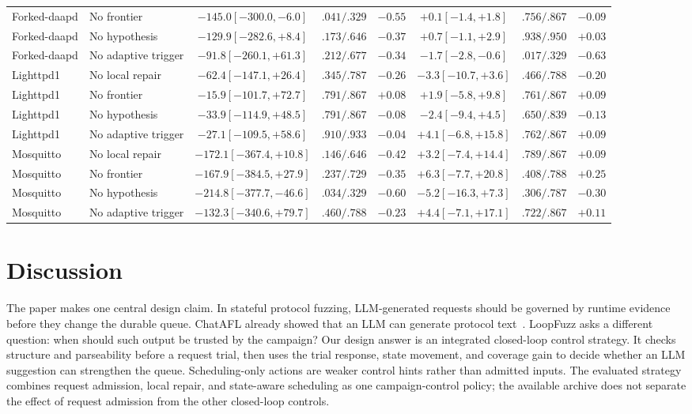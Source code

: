 \documentclass[final,5p,times,number]{elsarticle}
\begin{document}
\begin{table}[!t]
{{\begin{tabular}{l l c c c c c c}
Forked-daapd & No frontier & $-145.0 [-300.0,-6.0]$ & $.041/.329$ & $-0.55$ & $+0.1 [-1.4,+1.8]$ & $.756/.867$ & $-0.09$ \\
Forked-daapd & No hypothesis & $-129.9 [-282.6,+8.4]$ & $.173/.646$ & $-0.37$ & $+0.7 [-1.1,+2.9]$ & $.938/.950$ & $+0.03$ \\
Forked-daapd & No adaptive trigger & $-91.8 [-260.1,+61.3]$ & $.212/.677$ & $-0.34$ & $-1.7 [-2.8,-0.6]$ & $.017/.329$ & $-0.63$ \\
Lighttpd1 & No local repair & $-62.4 [-147.1,+26.4]$ & $.345/.787$ & $-0.26$ & $-3.3 [-10.7,+3.6]$ & $.466/.788$ & $-0.20$ \\
Lighttpd1 & No frontier & $-15.9 [-101.7,+72.7]$ & $.791/.867$ & $+0.08$ & $+1.9 [-5.8,+9.8]$ & $.761/.867$ & $+0.09$ \\
Lighttpd1 & No hypothesis & $-33.9 [-114.9,+48.5]$ & $.791/.867$ & $-0.08$ & $-2.4 [-9.4,+4.5]$ & $.650/.839$ & $-0.13$ \\
Lighttpd1 & No adaptive trigger & $-27.1 [-109.5,+58.6]$ & $.910/.933$ & $-0.04$ & $+4.1 [-6.8,+15.8]$ & $.762/.867$ & $+0.09$ \\
Mosquitto & No local repair & $-172.1 [-367.4,+10.8]$ & $.146/.646$ & $-0.42$ & $+3.2 [-7.4,+14.4]$ & $.789/.867$ & $+0.09$ \\
Mosquitto & No frontier & $-167.9 [-384.5,+27.9]$ & $.237/.729$ & $-0.35$ & $+6.3 [-7.7,+20.8]$ & $.408/.788$ & $+0.25$ \\
Mosquitto & No hypothesis & $-214.8 [-377.7,-46.6]$ & $.034/.329$ & $-0.60$ & $-5.2 [-16.3,+7.3]$ & $.306/.787$ & $-0.30$ \\
Mosquitto & No adaptive trigger & $-132.3 [-340.6,+79.7]$ & $.460/.788$ & $-0.23$ & $+4.4 [-7.1,+17.1]$ & $.722/.867$ & $+0.11$ \\
\bottomrule
\end{tabular}}
}
\end{table}

\section{Discussion}

The paper makes one central design claim. In stateful protocol fuzzing, LLM-generated requests should be governed by runtime evidence before they change the durable queue. ChatAFL already showed that an LLM can generate protocol text~\cite{chatafl}. LoopFuzz asks a different question: when should such output be trusted by the campaign? Our design answer is an integrated closed-loop control strategy. It checks structure and parseability before a request trial, then uses the trial response, state movement, and coverage gain to decide whether an LLM suggestion can strengthen the queue. Scheduling-only actions are weaker control hints rather than admitted inputs. The evaluated strategy combines request admission, local repair, and state-aware scheduling as one campaign-control policy; the available archive does not separate the effect of request admission from the other closed-loop controls.
\end{document}
